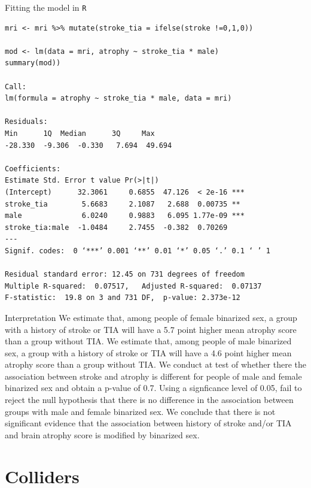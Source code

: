 \documentclass[10pt,t]{beamer}
\begin{document}
\begin{frame}[fragile]{Fitting the model in \texttt{R}}
\vspace{-7 mm}

\footnotesize

\begin{verbatim}
mri <- mri %>% mutate(stroke_tia = ifelse(stroke !=0,1,0))

mod <- lm(data = mri, atrophy ~ stroke_tia * male)
summary(mod))

Call:
lm(formula = atrophy ~ stroke_tia * male, data = mri)

Residuals:
Min      1Q  Median      3Q     Max 
-28.330  -9.306  -0.330   7.694  49.694 

Coefficients:
Estimate Std. Error t value Pr(>|t|)    
(Intercept)      32.3061     0.6855  47.126  < 2e-16 ***
stroke_tia        5.6683     2.1087   2.688  0.00735 ** 
male              6.0240     0.9883   6.095 1.77e-09 ***
stroke_tia:male  -1.0484     2.7455  -0.382  0.70269    
---
Signif. codes:  0 ‘***’ 0.001 ‘**’ 0.01 ‘*’ 0.05 ‘.’ 0.1 ‘ ’ 1

Residual standard error: 12.45 on 731 degrees of freedom
Multiple R-squared:  0.07517,	Adjusted R-squared:  0.07137 
F-statistic:  19.8 on 3 and 731 DF,  p-value: 2.373e-12
\end{verbatim}

\end{frame}

\begin{frame}{Interpretation}
	We estimate that, among people of female binarized sex, a group with a history of stroke or TIA will have a 5.7 point higher mean atrophy score than a group without TIA. We estimate that, among people of male binarized sex, a group with a history of stroke or TIA will have a 4.6 point higher mean atrophy score than a group without TIA. We conduct at test of whether there the association between stroke and atrophy is different for people of male and female binarized sex and obtain a p-value of 0.7. Using a signficance level of 0.05, fail to reject the null hypothesis that there is no difference in the association between groups with male and female binarized sex. We conclude that there is not significant evidence that the association between history of stroke and/or TIA and brain atrophy score is modified by binarized sex.
\end{frame}

\section{Colliders}
\end{document}
